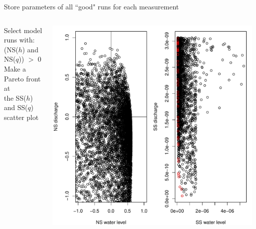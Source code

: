 \begin{frame}{Store parameters of all ``good" runs for each measurement}
\begin{columns}
   \begin{column}{0.4\linewidth}
   Select model runs with:\\ (NS($h$) and NS($q$)) $>$ 0\\
   \bigskip
   Make a Pareto front at \\ the SS($h$) and SS($q$) scatter plot
   \end{column}
   \begin{column}{0.6\linewidth}
   \includegraphics[width=0.9\linewidth]{img/pareto}
   \end{column}
\end{columns}

\end{frame}

